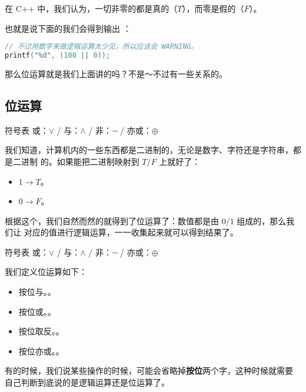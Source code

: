 \begin{frame}[fragile]
在 C++ 中，我们认为，一切非零的都是真的（$T$），而零是假的（$F$）。\pause

也就是说下面的我们会得到输出 ：
\begin{lstlisting}[language=C++]
// 不过用数字来做逻辑运算太少见，所以应该会 WARNING。
printf("%d", (100 || 0));
\end{lstlisting}
\end{frame}

\begin{frame}
那么位运算就是我们上面讲的吗？不是～不过有一些关系的。
\end{frame}


\subsection{位运算}
\begin{frame}
\begin{block}{符号表}
或：$\lor$ / \cmd{||}\hfill
与：$\land$ / \cmd{\&\&}\hfill
非：$\lnot$ / \cmd{!}\hfill
亦或：$\oplus$ \hfill
\end{block}
我们知道，计算机内的一些东西都是二进制的，无论是数字、字符还是字符串，都是二进制
的。如果能把二进制映射到 $T/F$ 上就好了：\pause
\begin{itemize}
    \item $1 \to T$。\pause
    \item $0 \to F$。\pause
\end{itemize}

根据这个，我们自然而然的就得到了位运算了：数值都是由 $0 / 1$ 组成的，那么我们让
对应的值进行逻辑运算，一一收集起来就可以得到结果了。
\end{frame}

\begin{frame}
\begin{block}{符号表}
或：$\lor$ / \cmd{||}\hfill
与：$\land$ / \cmd{\&\&}\hfill
非：$\lnot$ / \cmd{!}\hfill
亦或：$\oplus$ \hfill
\end{block}

我们定义位运算如下：
\begin{itemize}
    \item 按位与。\cmd{\&}。
    \item 按位或。\cmd{|}。
    \item 按位取反。\cmd{\ \~}。
    \item 按位亦或。\cmd{\ \^}。
\end{itemize}

有的时候，我们说某些操作的时候，可能会省略掉\textbf{按位}两个字，这种时候就需要
自己判断到底说的是逻辑运算还是位运算了。
\end{frame}

